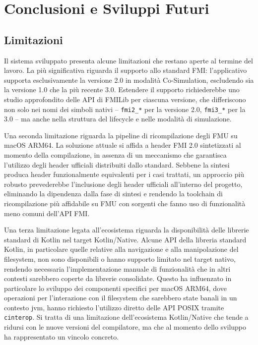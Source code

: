 \chapter{Conclusioni e Sviluppi Futuri}
\label{chap:conclusioni}

\section{Limitazioni}
\label{sec:conclusioni-limitazioni}

Il sistema sviluppato presenta alcune limitazioni che restano aperte al termine del lavoro. La più significativa riguarda il supporto allo standard FMI: l'applicativo supporta esclusivamente la versione 2.0 in modalità Co-Simulation, escludendo sia la versione 1.0 che la più recente 3.0. Estendere il supporto richiederebbe uno studio approfondito delle API di FMILib per ciascuna versione, che differiscono non solo nei nomi dei simboli nativi -- \texttt{fmi2\_*} per la versione 2.0, \texttt{fmi3\_*} per la 3.0 -- ma anche nella struttura del lifecycle e nelle modalità di simulazione.

Una seconda limitazione riguarda la pipeline di ricompilazione degli FMU su macOS ARM64. La soluzione attuale si affida a header FMI 2.0 sintetizzati al momento della compilazione, in assenza di un meccanismo che garantisca l'utilizzo degli header ufficiali distribuiti dallo standard. Sebbene la sintesi produca header funzionalmente equivalenti per i casi trattati, un approccio più robusto prevederebbe l'inclusione degli header ufficiali all'interno del progetto, eliminando la dipendenza dalla fase di sintesi e rendendo la toolchain di ricompilazione più affidabile su FMU con sorgenti che fanno uso di funzionalità meno comuni dell'API FMI.

Una terza limitazione legata all'ecosistema riguarda la disponibilità delle librerie standard di Kotlin nel target Kotlin/Native. Alcune API della libreria standard Kotlin, in particolare quelle relative alla navigazione e alla manipolazione del filesystem, non sono disponibili o hanno supporto limitato nel target nativo, rendendo necessaria l'implementazione manuale di funzionalità che in altri contesti sarebbero coperte da librerie consolidate. Questo ha influenzato in particolare lo sviluppo dei componenti specifici per macOS ARM64, dove operazioni per l'interazione con il filesystem che sarebbero state banali in un contesto \ac{jvm}, hanno richiesto l'utilizzo diretto delle API POSIX tramite \texttt{cinterop}. Si tratta di una limitazione dell'ecosistema Kotlin/Native che tende a ridursi con le nuove versioni del compilatore, ma che al momento dello sviluppo ha rappresentato un vincolo concreto.

